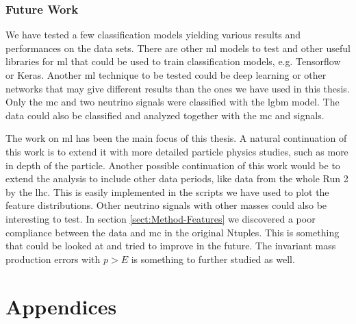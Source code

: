\documentclass[a4paper, american, 12pt]{report}
\begin{document}
	
	\section{Future Work}
	\label{sect:Conclusion-Future}
	We have tested a few classification models yielding various results and performances on the data sets. There are other \acrshort{ml} models to test and other useful libraries for \acrshort{ml} that could be used to train classification models, e.g. Tensorflow or Keras. Another \acrshort{ml} technique to be tested could be deep learning or other networks that may give different results than the ones we have used in this thesis. Only the \acrshort{mc} and two neutrino signals were classified with the \acrshort{lgbm} model. The data could also be classified and analyzed together with the \acrshort{mc} and signals.
	
	The work on \acrshort{ml} has been the main focus of this thesis. A natural continuation of this work is to extend it with more detailed particle physics studies, such as more in depth of the particle. Another possible continuation of this work would be to extend the analysis to include other data periods, like data from the whole Run 2 by the \acrshort{lhc}. This is easily implemented in the scripts we have used to plot the feature distributions. Other neutrino signals with other masses could also be interesting to test. In section \ref{sect:Method-Features} we discovered a poor compliance between the data and \acrshort{mc} in the original Ntuples. This is something that could be looked at and tried to improve in the future. The invariant mass production errors with $p>E$ is something to further studied as well.

	

	\appendix
	\part{Appendices}
	\label{part:Appendix}
	
\end{document}
